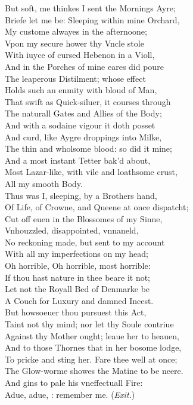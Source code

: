 \documentclass[a5paper,DIV=calc,11pt]{scrbook}
\begin{document}
\begin{drama*}
    But soft, me thinkes I sent the Mornings Ayre;\\
    Briefe let me be: Sleeping within mine Orchard,\\
    My custome alwayes in the afternoone;\\
    Vpon my secure hower thy Vncle stole\\
    With iuyce of cursed Hebenon in a Violl,\\
    And in the Porches of mine eares did poure\\
    The leaperous Distilment; whose effect\\
    Holds such an enmity with bloud of Man,\\
    That swift as Quick-siluer, it courses through\\
    The naturall Gates and Allies of the Body;\\
    And with a sodaine vigour it doth posset\\
    And curd, like Aygre droppings into Milke,\\
    The thin and wholsome blood: so did it mine;\\
    And a most instant Tetter bak'd about,\\
    Most Lazar-like, with vile and loathsome crust,\\
    All my smooth Body.\\
    Thus was I, sleeping, by a Brothers hand,\\
    Of Life, of Crowne, and Queene at once dispatcht;\\
    Cut off euen in the Blossomes of my Sinne,\\
    Vnhouzzled, disappointed, vnnaneld,\\
    No reckoning made, but sent to my account\\
    With all my imperfections on my head;\\
    Oh horrible, Oh horrible, most horrible:\\
    If thou hast nature in thee beare it not;\\
    Let not the Royall Bed of Denmarke be\\
    A Couch for Luxury and damned Incest.\\
    But howsoeuer thou pursuest this Act,\\
    Taint not thy mind; nor let thy Soule contriue\\
    Against thy Mother ought; leaue her to heauen,\\
    And to those Thornes that in her bosome lodge,\\
    To pricke and sting her. Fare thee well at once;\\
    The Glow-worme showes the Matine to be neere.\\
    And gins to pale his vneffectuall Fire:\\
    Adue, adue, \ham: remember me. \hfill(\textit{Exit.})
    

\end{drama*}
\end{document}

